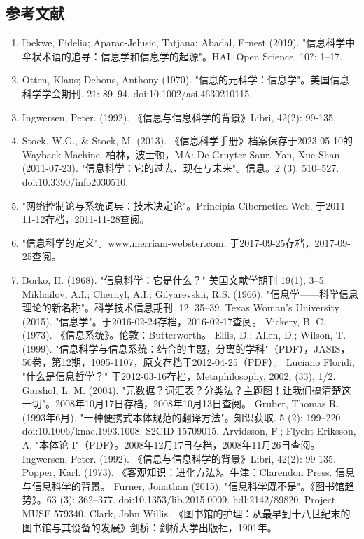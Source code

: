 \subsection{参考文献}  
\begin{enumerate}
\item Ibekwe, Fidelia; Aparac-Jelusic, Tatjana; Abadal, Ernest (2019). "信息科学中伞状术语的追寻：信息学和信息学的起源"。HAL Open Science. 10?: 1–17.  
\item Otten, Klaus; Debons, Anthony (1970). "信息的元科学：信息学"。美国信息科学学会期刊. 21: 89–94. doi:10.1002/asi.4630210115.  
\item Ingwersen, Peter. (1992). 《信息与信息科学的背景》Libri, 42(2): 99-135.  
\item Stock, W.G., & Stock, M. (2013). 《信息科学手册》档案保存于2023-05-10的Wayback Machine. 柏林，波士顿，MA: De Gruyter Saur.  
Yan, Xue-Shan (2011-07-23). "信息科学：它的过去、现在与未来"。信息。2 (3): 510–527. doi:10.3390/info2030510.  
\item "网络控制论与系统词典：技术决定论"。Principia Cibernetica Web. 于2011-11-12存档，2011-11-28查阅。  
\item "信息科学的定义"。www.merriam-webster.com. 于2017-09-25存档，2017-09-25查阅。  
\item Borko, H. (1968). "信息科学：它是什么？" 美国文献学期刊 19(1), 3–5.  
Mikhailov, A.I.; Chernyl, A.I.; Gilyarevskii, R.S. (1966). "信息学——科学信息理论的新名称"。科学技术信息期刊. 12: 35–39.  
Texas Woman's University (2015). "信息学"。于2016-02-24存档，2016-02-17查阅。  
Vickery, B. C. (1973). 《信息系统》。伦敦：Butterworth。  
Ellis, D.; Allen, D.; Wilson, T. (1999). "信息科学与信息系统：结合的主题，分离的学科"（PDF），JASIS，50卷，第12期，1095-1107，原文存档于2012-04-25（PDF）。  
Luciano Floridi, "什么是信息哲学？" 于2012-03-16存档，Metaphilosophy, 2002, (33), 1/2.  
Garshol, L. M. (2004). "元数据？词汇表？分类法？主题图！让我们搞清楚这一切"。2008年10月17日存档，2008年10月13日查阅。  
Gruber, Thomas R. (1993年6月). "一种便携式本体规范的翻译方法"。知识获取. 5 (2): 199–220. doi:10.1006/knac.1993.1008. S2CID 15709015.  
Arvidsson, F.; Flycht-Eriksson, A. "本体论 I"（PDF）。2008年12月17日存档，2008年11月26日查阅。  
Ingwersen, Peter. (1992). 《信息与信息科学的背景》Libri, 42(2): 99-135.  
Popper, Karl. (1973). 《客观知识：进化方法》。牛津：Clarendon Press. 信息与信息科学的背景。  
Furner, Jonathan (2015). "信息科学既不是"。《图书馆趋势》。63 (3): 362–377. doi:10.1353/lib.2015.0009. hdl:2142/89820. Project MUSE 579340.  
Clark, John Willis. 《图书馆的护理：从最早到十八世纪末的图书馆与其设备的发展》剑桥：剑桥大学出版社，1901年。  

\end{enumerate}
